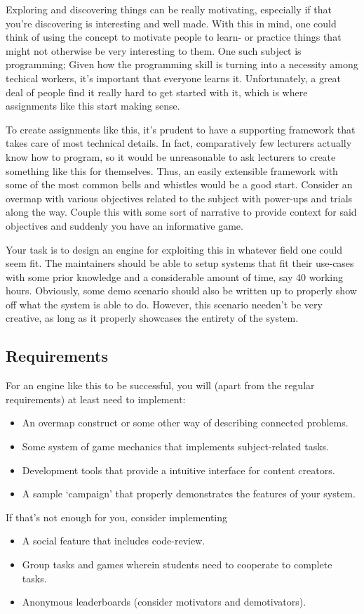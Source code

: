\begin{refsection}
Exploring and discovering things can be really motivating, especially if that you're discovering is interesting and well made. With this in mind, one could think of using the concept to motivate people to learn- or practice things that might not otherwise be very interesting to them. One such subject is programming; Given how the programming skill is turning into a necessity among techical workers, it's important that everyone learns it. Unfortunately, a great deal of people find it really hard to get started with it, which is where assignments like this start making sense.

To create assignments like this, it's prudent to have a supporting framework that takes care of most technical details. In fact, comparatively few lecturers actually know how to program, so it would be unreasonable to ask lecturers to create something like this for themselves. Thus, an easily extensible framework with some of the most common bells and whistles would be a good start. Consider an overmap with various objectives related to the subject with power-ups and trials along the way. Couple this with some sort of narrative to provide context for said objectives and suddenly you have an informative game.

Your task is to design an engine for exploiting this in whatever field one could seem fit. The maintainers should be able to setup systems that fit their use-cases with some prior knowledge and a considerable amount of time, say 40 working hours. Obviously, some demo scenario should also be written up to properly show off what the system is able to do. However, this scenario needen't be very creative, as long as it properly showcases the entirety of the system.

\subsection*{Requirements}
For an engine like this to be successful, you will (apart from the regular requirements) at least need to implement:
\begin{itemize}
    \item An overmap construct or some other way of describing connected problems.
    \item Some system of game mechanics that implements subject-related tasks.
    \item Development tools that provide a intuitive interface for content creators.
    \item A sample `campaign' that properly demonstrates the features of your system.
\end{itemize}
If that's not enough for you, consider implementing
\begin{itemize}
    \item A social feature that includes code-review.
    \item Group tasks and games wherein students need to cooperate to complete tasks.
    \item Anonymous leaderboards (consider motivators and demotivators).
\end{itemize}

\end{refsection}
